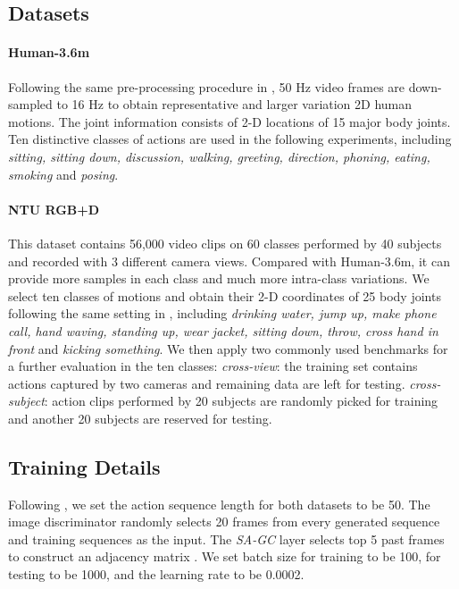\documentclass[runningheads]{llncs}
\begin{document}
\subsection{Datasets}
\paragraph{Human-3.6m} 
Following the same pre-processing procedure in \cite{cai2018deep,wang2019learning}, 50 Hz video frames are down-sampled to 16 Hz to obtain representative and larger variation 2D human motions. The joint information consists of 2-D locations of 15 major body joints. Ten distinctive classes of actions are used in the following experiments, including \textit{sitting, sitting down, discussion, walking, greeting, direction, phoning, eating, smoking} and \textit{posing}.

\paragraph{NTU RGB+D}
This dataset contains 56,000 video clips on 60 classes performed by 40 subjects and recorded with 3 different camera views. Compared with Human-3.6m, it can provide more samples in each class and much more intra-class variations. We select ten classes of motions and obtain their 2-D coordinates of 25 body joints following the same setting in \cite{wang2019learning}, including \textit{drinking water, jump up, make phone call, hand waving, standing up, wear jacket, sitting down, throw, cross hand in front} and \textit{kicking something}. We then apply two commonly used benchmarks for a further evaluation in the ten classes:
\textit{cross-view}: the training set contains actions captured by two cameras and remaining data are left for testing.
\textit{cross-subject}: action clips performed by 20 subjects are randomly picked for training and another 20 subjects are reserved for testing.

\subsection{Training Details}

Following \cite{wang2019learning}, we set the action sequence length for both datasets to be 50. The image discriminator randomly selects 20 frames from every generated sequence and training sequences as the input. The {\it SA-GC} layer selects top 5 past frames to construct an adjacency matrix . We set batch size for training to be 100, for testing to be 1000, and the learning rate to be 0.0002. 
\end{document}
